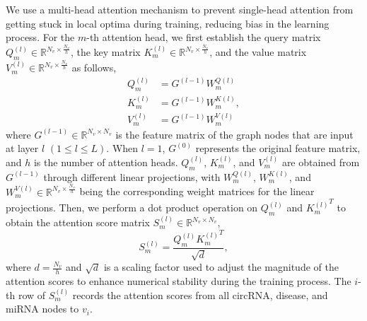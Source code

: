 \documentclass[journal,twoside,web]{ieeecolor}
\begin{document}
We use a multi-head attention mechanism to prevent single-head attention from getting stuck in local optima during training, reducing bias in the learning process. %
For the $m$-th attention head, we first establish the query matrix $Q_{m}^{(l)} \in \mathbb{R}^{N_v \times \frac{N_v}{h}}$, the key matrix $K_{m}^{(l)} \in \mathbb{R}^{N_v \times \frac{N_v}{h}}$, and the value matrix $V_{m}^{(l)} \in \mathbb{R}^{N_v \times \frac{N_v}{h}}$ as follows,
\begin{equation}
	\begin{aligned}
		{Q_{m}^{(l)}} &= G^{{(l - 1)}}{W_{m}^{Q{(l)}}} \\
		{K_{m}^{(l)}} &= G^{{(l - 1)}}{W_{m}^{K{(l)}}} ,\\
		{V_{m}^{(l)}} &= G^{(l - 1)}{W_{m}^{V{(l)}}}
	\end{aligned}
\end{equation}
where $G^{(l - 1)} \in \mathbb{R}^{N_v \times N_v}$ is the feature matrix of the graph nodes that are input at layer $l$ $(1 \leqslant l \leqslant L)$. When $l = 1$, $G^{(0)}$ represents the original feature matrix, and $h$ is the number of attention heads. $Q_{m}^{(l)}$, $K_{m}^{(l)}$, and $V_{m}^{(l)}$ are obtained from $G^{(l - 1)}$ through different linear projections, with $W_{m}^{Q{(l)}}$, $W_{m}^{K{(l)}}$, and $W_{m}^{V(l)} \in \mathbb{R}^{N_v \times \frac{N_v}{h}}$ being the corresponding weight matrices for the linear projections. Then, we perform a dot product operation on $Q_{m}^{(l)}$ and ${K_{m}^{(l)}}^T$ to obtain the attention score matrix ${S_{m}^{(l)}} \in \mathbb{R}^{N_v \times N_v}$,
\begin{equation}
	{S_{m}^{(l)}} = \frac{Q_{m}^{(l)}{K_{m}^{(l)}}^T}{\sqrt{d}},
\end{equation}
where $d = \frac{N_v}{h}$ and $\sqrt{d}$ is a scaling factor used to adjust the magnitude of the attention scores to enhance numerical stability during the training process. The $i$-th row of $S_{m}^{(l)}$ records the attention scores from all circRNA, disease, and miRNA nodes to $v_i$.
\end{document}
